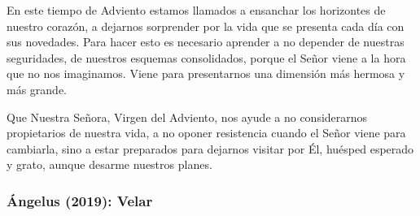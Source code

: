 \begin{body}
					En este tiempo de Adviento estamos llamados a ensanchar los horizontes de nuestro corazón, a dejarnos sorprender por la vida que se presenta cada día con sus novedades. Para hacer esto es necesario aprender a no depender de nuestras seguridades, de nuestros esquemas consolidados, porque el Señor viene a la hora que no nos imaginamos. Viene para presentarnos una dimensión más hermosa y más grande. 
					
					Que Nuestra Señora, Virgen del Adviento, nos ayude a no considerarnos propietarios de nuestra vida, a no oponer resistencia cuando el Señor viene para cambiarla, sino a estar preparados para dejarnos visitar por Él, huésped esperado y grato, aunque desarme nuestros planes.
				\end{body}
		
			\subsubsection{Ángelus (2019): Velar}
		
			
